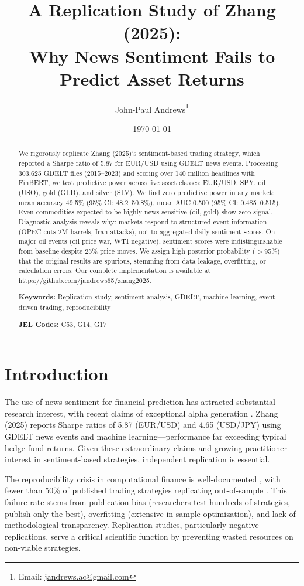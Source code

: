 \documentclass[11pt]{article}
\title{A Replication Study of Zhang (2025): \\
Why News Sentiment Fails to Predict Asset Returns}
\author[1]{John-Paul Andrews\thanks{Email: \href{mailto:jandrews.ac@gmail.com}{jandrews.ac@gmail.com}}}
\affil[1]{Independent Researcher}
\date{\today}
\begin{document}
\maketitle

\begin{abstract}
We rigorously replicate Zhang (2025)'s sentiment-based trading strategy, which reported a Sharpe ratio of 5.87 for EUR/USD using GDELT news events. Processing 303,625 GDELT files (2015--2023) and scoring over 140 million headlines with FinBERT, we test predictive power across five asset classes: EUR/USD, SPY, oil (USO), gold (GLD), and silver (SLV). We find zero predictive power in any market: mean accuracy 49.5\% (95\% CI: 48.2--50.8\%), mean AUC 0.500 (95\% CI: 0.485--0.515). Even commodities expected to be highly news-sensitive (oil, gold) show zero signal. Diagnostic analysis reveals why: markets respond to structured event information (OPEC cuts 2M barrels, Iran attacks), not to aggregated daily sentiment scores. On major oil events (oil price war, WTI negative), sentiment scores were indistinguishable from baseline despite 25\% price moves. We assign high posterior probability ($>$95\%) that the original results are spurious, stemming from data leakage, overfitting, or calculation errors. Our complete implementation is available at \url{https://github.com/jandrews65/zhang2025}.

\noindent\textbf{Keywords:} Replication study, sentiment analysis, GDELT, machine learning, event-driven trading, reproducibility

\noindent\textbf{JEL Codes:} C53, G14, G17
\end{abstract}

\section{Introduction}

The use of news sentiment for financial prediction has attracted substantial research interest, with recent claims of exceptional alpha generation \citep{tetlock2007giving, bollen2011twitter}. Zhang (2025) \citep{zhang2025interpretable} reports Sharpe ratios of 5.87 (EUR/USD) and 4.65 (USD/JPY) using GDELT news events and machine learning---performance far exceeding typical hedge fund returns. Given these extraordinary claims and growing practitioner interest in sentiment-based strategies, independent replication is essential.

The reproducibility crisis in computational finance is well-documented \citep{harvey2016backtests, hou2020replicating}, with fewer than 50\% of published trading strategies replicating out-of-sample \citep{mclean2016does}. This failure rate stems from publication bias (researchers test hundreds of strategies, publish only the best), overfitting (extensive in-sample optimization), and lack of methodological transparency. Replication studies, particularly negative replications, serve a critical scientific function by preventing wasted resources on non-viable strategies.
\end{document}
